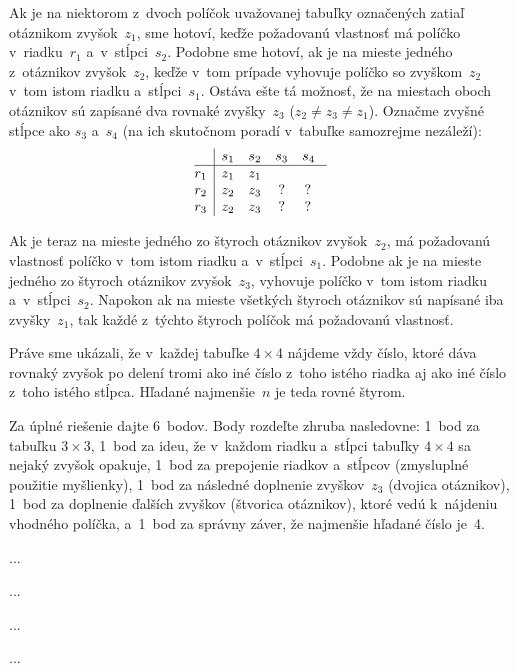 {Ak je na niektorom z~dvoch políčok uvažovanej tabuľky označených zatiaľ otáznikom
zvyšok~$z_1$, sme hotoví,
keďže požadovanú vlastnosť má políčko v~riadku~$r_1$ a~v~stĺpci~$s_2$.
Podobne sme hotoví, ak je na mieste jedného z~otáznikov zvyšok~$z_2$,
keďže v~tom prípade vyhovuje políčko so
zvyškom~$z_2$ v~tom istom riadku a~stĺpci~$s_1$. Ostáva ešte tá
možnosť, že na miestach oboch otáznikov sú zapísané dva rovnaké
zvyšky~$z_3$ ($z_2\ne z_3\ne z_1$).
Označme zvyšné stĺpce ako $s_3$ a~$s_4$ (na ich skutočnom poradí
v~tabuľke samozrejme nezáleží):
$$
\vbox{\let\\=\cr
\halign{\strut#\hss\enspace\vrule&&\hss\enspace#\enspace\hss\\
& $s_1$& $s_2$& $s_3$&$s_4$ \\
\noalign{\hrule}
$r_1$& $z_1$& $z_1$& & \\
$r_2$& $z_2$& $z_3$& ?&? \\
$r_3$& $z_2$& $z_3$& ?&? \\
}}
$$

Ak je teraz na mieste jedného zo štyroch otáznikov zvyšok~$z_2$, má
požadovanú vlastnosť políčko v~tom istom riadku a~v~stĺpci~$s_1$.
Podobne ak je na mieste jedného zo štyroch otáznikov
zvyšok~$z_3$, vyhovuje políčko v~tom istom riadku a~v~stĺpci~$s_2$.
Napokon ak na mieste všetkých štyroch otáznikov sú napísané iba
zvyšky~$z_1$, tak každé z~týchto štyroch políčok
má požadovanú vlastnosť.

Práve sme ukázali, že v~každej tabuľke
$4 \times 4$ nájdeme vždy číslo, ktoré dáva rovnaký zvyšok po delení
tromi ako iné číslo z~toho istého riadka aj ako iné číslo z~toho istého
stĺpca. Hľadané najmenšie~$n$ je teda rovné štyrom.


\nobreak\medskip\petit\noindent
Za úplné riešenie dajte 6~bodov.
Body rozdeľte zhruba nasledovne:
1~bod za tabuľku $3\times3$,
1~bod za ideu, že v~každom riadku a~stĺpci tabuľky $4\times4$ sa nejaký zvyšok opakuje,
1~bod za prepojenie riadkov a~stĺpcov (zmysluplné použitie myšlienky),
1~bod za následné doplnenie zvyškov~$z_3$ (dvojica otáznikov),
1~bod za doplnenie ďalších zvyškov (štvorica otáznikov), ktoré vedú k~nájdeniu
vhodného políčka,
a~1~bod za správny záver, že najmenšie hľadané číslo je~4.
\endpetit
\bigbreak
}

{%
...}

{%
...}

{%
...}

{%
...}

